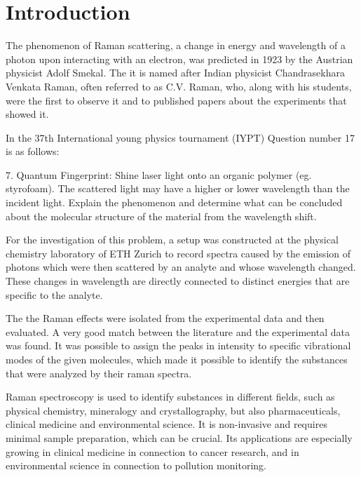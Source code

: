 \section{Introduction}


The phenomenon of Raman scattering, a change in energy and wavelength of a photon upon interacting with an electron, was predicted in 1923 by the Austrian physicist Adolf Smekal. The it is named after  Indian physicist Chandrasekhara Venkata Raman, often referred to as C.V. Raman, who, along with his students, were the first to observe it and to published papers about the experiments that showed it.

\bigskip

In the 37th International young physics tournament (IYPT) Question number 17 is as follows:

\bigskip

7. Quantum Fingerprint: Shine laser light onto an organic polymer (eg. styrofoam). The scattered light may have a higher or lower wavelength than the incident light. Explain the phenomenon and determine what can be concluded about the molecular structure of the material from the wavelength shift.\cite{iypt}

\bigskip

For the investigation of this problem, a setup was constructed at the physical chemistry laboratory of ETH Zurich to record spectra caused by the emission of photons which were then scattered by an analyte and whose wavelength changed. These changes in wavelength are directly connected to distinct energies that are specific to the analyte.

The the Raman effects were isolated from the experimental data and then evaluated. A very good match between the literature and the experimental data was found. It was possible to assign the peaks in intensity to specific vibrational modes of the given molecules, which made it possible to identify the substances that were analyzed by their raman spectra.

\bigskip

Raman spectroscopy is used to identify substances in different fields, such as physical chemistry, mineralogy and crystallography, but also pharmaceuticals, clinical medicine and environmental science. It is non-invasive and requires minimal sample preparation, which can be crucial. Its applications are especially growing in clinical medicine in connection to cancer research, and in environmental science in connection to pollution monitoring.

\newpage